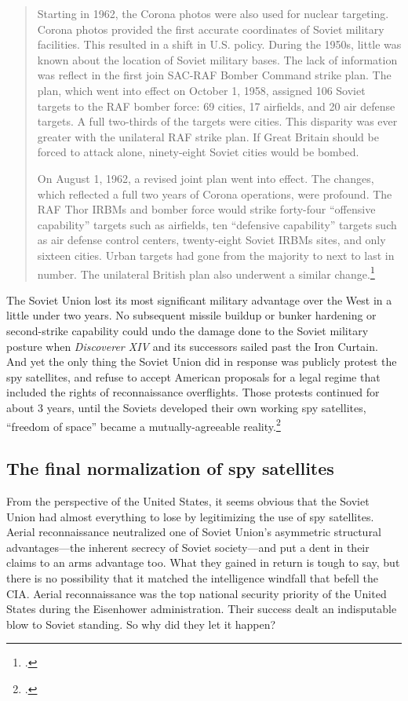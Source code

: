 \documentclass{report}
\begin{document}
\begin{quote}
Starting in 1962, the Corona photos were also used for nuclear targeting. Corona photos provided the first accurate coordinates of Soviet military facilities. This resulted in a shift in U.S. policy. During the 1950s, little was known about the location of Soviet military bases. The lack of information was reflect in the first join SAC-RAF Bomber Command strike plan. The plan, which went into effect on October 1, 1958, assigned 106 Soviet targets to the RAF bomber force: 69 cities, 17 airfields, and 20 air defense targets. A full two-thirds of the targets were cities. This disparity was ever greater with the unilateral RAF strike plan. If Great Britain should be forced to attack alone, ninety-eight Soviet cities would be bombed.

On August 1, 1962, a revised joint plan went into effect. The changes, which reflected a full two years of Corona operations, were profound. The RAF Thor IRBMs and bomber force would strike forty-four ``offensive capability'' targets such as airfields, ten ``defensive capability'' targets such as air defense control centers, twenty-eight Soviet IRBMs sites, and only sixteen cities. Urban targets had gone from the majority to next to last in number. The unilateral British plan also underwent a similar change.\footcite[p.~139]{peebles_corona_1997}
\end{quote}

The Soviet Union lost its most significant military advantage over the West in a little under two years. No subsequent missile buildup or bunker hardening or second-strike capability could undo the damage done to the Soviet military posture when \emph{Discoverer XIV} and its successors sailed past the Iron Curtain. And yet the only thing the Soviet Union did in response was publicly protest the spy satellites, and refuse to accept American proposals for a legal regime that included the rights of reconnaissance overflights. Those protests continued for about 3 years, until the Soviets developed their own working spy satellites, ``freedom of space'' became a mutually-agreeable reality.\footcite[p.~271-275]{mcdougall_heavens_1985}

\subsection{The final normalization of spy satellites}
From the perspective of the United States, it seems obvious that the Soviet Union had almost everything to lose by legitimizing the use of spy satellites. Aerial reconnaissance neutralized one of Soviet Union's asymmetric structural advantages---the inherent secrecy of Soviet society---and put a dent in their claims to an arms advantage too. What they gained in return is tough to say, but there is no possibility that it matched the intelligence windfall that befell the CIA. Aerial reconnaissance was the top national security priority of the United States during the Eisenhower administration. Their success dealt an indisputable blow to Soviet standing. So why did they let it happen?
\end{document}
